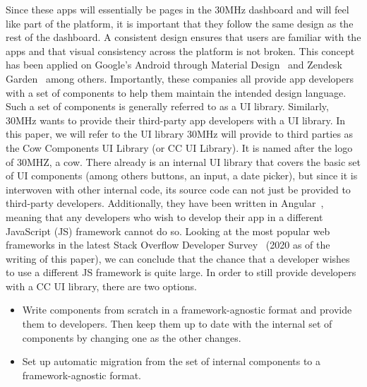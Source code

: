 Since these apps will essentially be pages in the 30MHz dashboard and will feel like part of the platform, it is important that they follow the same design as the rest of the dashboard. A consistent design ensures that users are familiar with the apps and that visual consistency across the platform is not broken. This concept has been applied on Google's Android through Material Design~ and Zendesk Garden~ among others. Importantly, these companies all provide app developers with a set of components to help them maintain the intended design language. Such a set of components is generally referred to as a UI library.
Similarly, 30MHz wants to provide their third-party app developers with a UI library. In this paper, we will refer to the UI library 30MHz will provide to third parties as the Cow Components UI Library (or CC UI Library). It is named after the logo of 30MHZ, a cow. There already is an internal UI library that covers the basic set of UI components (among others buttons, an input, a date picker), but since it is interwoven with other internal code, its source code can not just be provided to third-party developers. Additionally, they have been written in Angular~, meaning that any developers who wish to develop their app in a different JavaScript (JS) framework cannot do so. Looking at the most popular web frameworks in the latest Stack Overflow Developer Survey~ (2020 as of the writing of this paper), we can conclude that the chance that a developer wishes to use a different JS framework is quite large. In order to still provide developers with a CC UI library, there are two options.

\begin{itemize}
  \item Write components from scratch in a framework-agnostic format and provide them to developers. Then keep them up to date with the internal set of components by changing one as the other changes.
  \item Set up automatic migration from the set of internal components to a framework-agnostic format.
\end{itemize}

